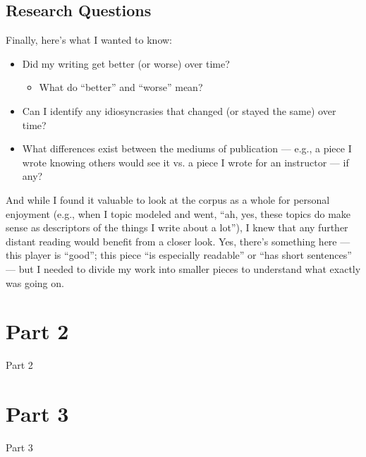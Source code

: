 \documentclass[letterpaper,10pt,english]{jupyterBook}
\begin{document}
\section{Research Questions}
\label{\detokenize{part1:research-questions}}
\sphinxAtStartPar
Finally, here’s what I wanted to know:
\begin{itemize}
\item {} 
\sphinxAtStartPar
Did my writing get better (or worse) over time?
\begin{itemize}
\item {} 
\sphinxAtStartPar
What do “better” and “worse” mean?

\end{itemize}

\item {} 
\sphinxAtStartPar
Can I identify any idiosyncrasies that changed (or stayed the same) over time?

\item {} 
\sphinxAtStartPar
What differences exist between the mediums of publication — e.g., a piece I wrote knowing others would see it vs. a piece I wrote for an instructor — if any?

\end{itemize}

\sphinxAtStartPar
And while I found it valuable to look at the corpus as a whole for personal enjoyment (e.g., when I topic modeled and went, “ah, yes, these topics do make sense as descriptors of the things I write about a lot”), I knew that any further distant reading would benefit from a closer look. Yes, there’s something here — this player is “good”; this piece “is especially readable” or “has short sentences” — but I needed to divide my work into smaller pieces to understand what exactly was going on.

\sphinxstepscope


\chapter{Part 2}
\label{\detokenize{part2:part-2}}\label{\detokenize{part2::doc}}
\sphinxAtStartPar
Part 2

\sphinxstepscope


\chapter{Part 3}
\label{\detokenize{part3:part-3}}\label{\detokenize{part3::doc}}
\sphinxAtStartPar
Part 3







\renewcommand{\indexname}{Index}
\printindex
\end{document}
